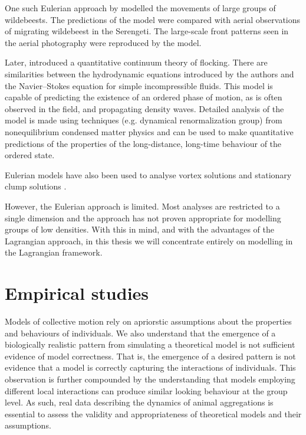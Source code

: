 One such Eulerian approach by \textcite{gueron93} modelled the movements of large groups of 
wildebeests. The predictions of the model were compared with aerial observations of migrating 
wildebeest in the Serengeti. The large-scale front patterns seen in the aerial photography were 
reproduced by the model.

Later, \textcite{toner98} introduced a quantitative continuum theory of flocking. There are 
similarities between the hydrodynamic equations introduced by the authors and the Navier--Stokes 
equation for simple incompressible fluids. This model is capable of predicting the existence of an 
ordered phase of motion, as is often observed in the field, and propagating density waves. Detailed 
analysis of the model is made using techniques (e.g. dynamical renormalization group) from 
nonequilibrium condensed matter physics and can be used to make quantitative predictions of the 
properties of the long-distance, long-time behaviour of the ordered state.

Eulerian models have also been used to analyse vortex solutions \parencite{topaz04} and stationary 
clump solutions \parencite{topaz06}.

However, the Eulerian approach is limited. Most analyses are restricted to a single dimension and the 
approach has not proven appropriate for modelling groups of low densities. With this in mind, and 
with the advantages of the Lagrangian approach, in this thesis we will concentrate entirely on 
modelling in the Lagrangian framework.

\section{Empirical studies}
\label{sec:empirical_studies}

Models of collective motion rely on apriorstic assumptions about the properties and behaviours of 
individuals. We also understand that the emergence of a biologically realistic pattern from 
simulating a theoretical model is not sufficient evidence of model correctness. That is, the 
emergence of a desired pattern is not evidence that a model is correctly capturing the interactions 
of individuals. This observation is further compounded by the understanding that models employing 
different local interactions can produce similar looking behaviour at the group level. As such, real 
data describing the dynamics of animal aggregations is essential to assess the validity and 
appropriateness of theoretical models and their assumptions.

